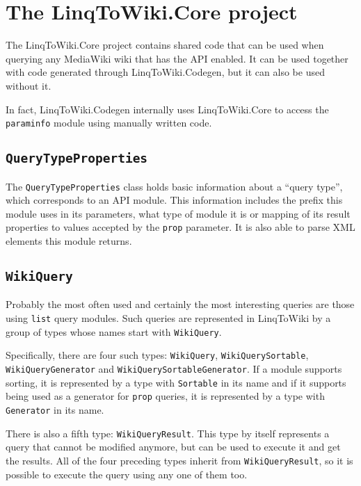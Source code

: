 \section{The LinqToWiki.Core project}

The LinqToWiki.Core project contains shared code that can be used when querying any MediaWiki wiki
that has the \ac{API} enabled.
It can be used together with code generated through LinqToWiki\allowbreak{}.Codegen,
but it can also be used without it.

In fact, LinqToWiki.\allowbreak{}Codegen internally uses LinqToWiki.Core to access the \texttt{paraminfo} module
using manually written code.

\subsection{\texorpdfstring{\lstinline{QueryTypeProperties}}{QueryTypeProperties}}

The \lstinline{QueryTypeProperties} class holds basic information about a “query type”,
which corresponds to an \ac{API} module.
This information includes the prefix this module uses in its parameters,
what type of module it is or mapping of its result properties to values accepted by the \texttt{prop} parameter.
It is also able to parse \ac{XML} elements this module returns.

\subsection{\texorpdfstring{\lstinline{WikiQuery}}{WikiQuery}}

Probably the most often used and certainly the most interesting queries are those using \texttt{list} query modules.
Such queries are represented in LinqToWiki by a group of types whose names start with \lstinline{WikiQuery}.

Specifically, there are four such types:
\lstinline{WikiQuery}, \lstinline{WikiQuerySortable}, \lstinline{Wiki}\lstBreak\lstinline{Query}\lstBreak\lstinline{Generator} and \lstinline{WikiQuerySortableGenerator}.
If a module supports sorting, it is represented by a type with \lstinline{Sortable} in its name
and if it supports being used as a generator for \texttt{prop} queries, it is represented by a type with \lstinline{Generator} in its name.

There is also a fifth type: \lstinline{WikiQueryResult}.
This type by itself represents a query that cannot be modified anymore,
but can be used to execute it and get the results.
All of the four preceding types inherit from \lstinline{WikiQueryResult},
so it is possible  to execute the query using any one of them too.

